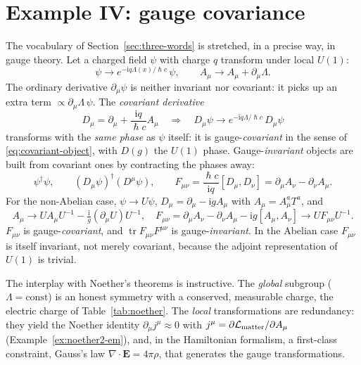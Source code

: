 \documentclass[11pt,a4paper,openany]{book}
\theoremstyle{definition}
\theoremstyle{plain}
\theoremstyle{remark}
\DeclareRobustCommand{\hbar}{\hslash}
\newcommand{\ii}{\mathrm{i}}
\newcommand{\vE}{\bm{E}}
\newcommand{\weakeq}{\approx}
\DeclareMathOperator{\tr}{tr}
\begin{document}
\section{Example IV: gauge covariance}
\label{sec:gauge}

The vocabulary of Section~\ref{sec:three-words} is stretched, in a
precise way, in gauge theory. Let a charged field $\psi$ with charge $q$
transform under local $U(1)$:
\begin{equation}\label{eq:u1}
  \psi\to e^{-\ii q\Lambda(x)/\hbar c}\,\psi,\qquad
  A_\mu\to A_\mu+\partial_\mu\Lambda .
\end{equation}
The ordinary derivative $\partial_\mu\psi$ is neither invariant nor covariant:
it picks up an extra term $\propto\partial_\mu\Lambda\,\psi$. The
\emph{covariant derivative}
\begin{equation}\label{eq:covder}
  D_\mu=\partial_\mu+\frac{\ii q}{\hbar c}A_\mu
  \quad\Longrightarrow\quad
  D_\mu\psi\to e^{-\ii q\Lambda/\hbar c}\,D_\mu\psi
\end{equation}
transforms with the \emph{same phase} as $\psi$ itself: it is
gauge-\emph{covariant} in the sense of \eqref{eq:covariant-object}, with
$D(g)$ the $U(1)$ phase. Gauge-\emph{invariant} objects are built from
covariant ones by contracting the phases away:
\begin{equation}
  \psi^\dagger\psi,\qquad(D_\mu\psi)^\dagger(D^\mu\psi),\qquad
  F_{\mu\nu}=\frac{\hbar c}{\ii q}[D_\mu,D_\nu]=\partial_\mu A_\nu-\partial_\nu A_\mu .
\end{equation}
For the non-Abelian case, $\psi\to U\psi$, $D_\mu=\partial_\mu-\ii gA_\mu$
with $A_\mu=A_\mu^aT^a$, and
\begin{equation}
  A_\mu\to UA_\mu U^{-1}-\tfrac{\ii}{g}(\partial_\mu U)U^{-1},\quad
  F_{\mu\nu}=\partial_\mu A_\nu-\partial_\nu A_\mu-\ii g[A_\mu,A_\nu]\to UF_{\mu\nu}U^{-1}.
\end{equation}
$F_{\mu\nu}$ is gauge-\emph{covariant}, and $\tr F_{\mu\nu}F^{\mu\nu}$ is
gauge-\emph{invariant}. In the Abelian case $F_{\mu\nu}$ is itself invariant,
not merely covariant, because the adjoint representation of $U(1)$ is trivial.

The interplay with Noether's theorems is instructive. The \emph{global} subgroup
($\Lambda=\text{const}$) is an honest symmetry with a conserved, measurable
charge, the electric charge of Table~\ref{tab:noether}. The \emph{local}
transformations are redundancy: they yield the Noether identity
$\partial_\mu j^\mu\weakeq0$ with $j^\mu=\partial\mathcal L_{\rm matter}/\partial A_\mu$
(Example~\ref{ex:noether2-em}), and, in the Hamiltonian formalism,
a first-class constraint, Gauss's law $\nabla\!\cdot\vE=4\pi\rho$, that
generates the gauge transformations.
\end{document}
